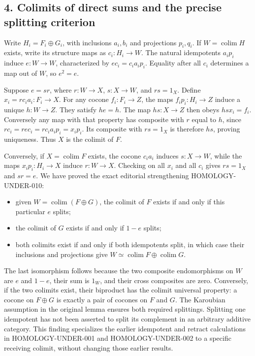 \subsection{4. Colimits of direct sums and the precise splitting criterion}\label{note-09-colimits-of-direct-sums-and-the-precise-splitting-criterion}

Write \(H_i=F_i\oplus G_i\), with inclusions \(a_i,b_i\) and projections \(p_i,q_i\). If \(W=\operatorname{colim}H\) exists, write its structure maps as \(c_i:H_i\to W\). The natural idempotents \(a_i p_i\) induce \(e:W\to W\), characterized by \(e c_i=c_i a_i p_i\). Equality after all \(c_i\) determines a map out of \(W\), so \(e^2=e\).

Suppose \(e=s r\), where \(r:W\to X\), \(s:X\to W\), and \(rs=1_X\). Define \(x_i=r c_i a_i:F_i\to X\). For any cocone \(f_i:F_i\to Z\), the maps \(f_i p_i:H_i\to Z\) induce a unique \(h:W\to Z\). They satisfy \(he=h\). The map \(hs:X\to Z\) then obeys \(hs x_i=f_i\). Conversely any map with that property has composite with \(r\) equal to \(h\), since \(r c_i=r e c_i=r c_i a_i p_i=x_i p_i\). Its composite with \(rs=1_X\) is therefore \(hs\), proving uniqueness. Thus \(X\) is the colimit of \(F\).

Conversely, if \(X=\operatorname{colim}F\) exists, the cocone \(c_i a_i\) induces \(s:X\to W\), while the maps \(x_i p_i:H_i\to X\) induce \(r:W\to X\). Checking on all \(x_i\) and all \(c_i\) gives \(rs=1_X\) and \(sr=e\). We have proved the exact editorial strengthening HOMOLOGY-UNDER-010:

\begin{itemize}
\tightlist
\item
  given \(W=\operatorname{colim}(F\oplus G)\), the colimit of \(F\) exists if and only if this particular \(e\) splits;
\item
  the colimit of \(G\) exists if and only if \(1-e\) splits;
\item
  both colimits exist if and only if both idempotents split, in which case their inclusions and projections give \(W\simeq\operatorname{colim}F\oplus\operatorname{colim}G\).
\end{itemize}

The last isomorphism follows because the two composite endomorphisms on \(W\) are \(e\) and \(1-e\), their sum is \(1_W\), and their cross composites are zero. Conversely, if the two colimits exist, their biproduct has the colimit universal property: a cocone on \(F\oplus G\) is exactly a pair of cocones on \(F\) and \(G\). The Karoubian assumption in the original lemma ensures both required splittings. Splitting one idempotent has not been asserted to split its complement in an arbitrary additive category. This finding specializes the earlier idempotent and retract calculations in HOMOLOGY-UNDER-001 and HOMOLOGY-UNDER-002 to a specific receiving colimit, without changing those earlier results.

